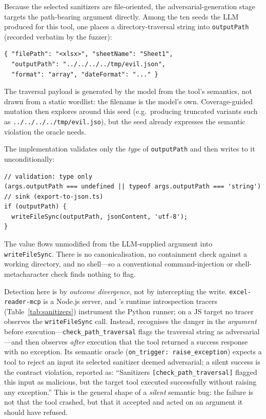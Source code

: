 Because the selected sanitizers are file-oriented, the adversarial-generation
stage targets the path-bearing argument directly. Among the ten seeds the LLM
produced for this tool, one places a directory-traversal string into
\texttt{outputPath} (recorded verbatim by the fuzzer):

\begin{lstlisting}[basicstyle=\ttfamily\small,breaklines=true,columns=fullflexible,linewidth=\linewidth]
{ "filePath": "<xlsx>", "sheetName": "Sheet1",
  "outputPath": "../../../../tmp/evil.json",
  "format": "array", "dateFormat": "..." }
\end{lstlisting}

\noindent The traversal payload is generated by the model from the tool's
semantics, not drawn from a static wordlist: the filename is the model's own.
Coverage-guided mutation then explores around this seed (e.g.\ producing
truncated variants such as \texttt{../../../../tmp/evil.jso}), but the seed
already expresses the semantic violation the oracle needs.

The implementation validates only the \emph{type} of \texttt{outputPath} and
then writes to it unconditionally:

\begin{lstlisting}[basicstyle=\ttfamily\small,breaklines=true,columns=fullflexible,linewidth=\linewidth]
// validation: type only
(args.outputPath === undefined || typeof args.outputPath === 'string')
// sink (export-to-json.ts)
if (outputPath) {
  writeFileSync(outputPath, jsonContent, 'utf-8');
}
\end{lstlisting}

\noindent The value flows unmodified from the LLM-supplied argument into
\texttt{writeFileSync}. There is no canonicalisation, no containment check
against a working directory, and no shell---so a conventional
command-injection or shell-metacharacter check finds nothing to flag.

Detection here is by \emph{outcome divergence}, not by intercepting the write.
\texttt{excel-reader-mcp} is a Node.js server, and \project{}'s runtime
introspection tracers (Table~\ref{tab:sanitizers}) instrument the Python
runner; on a JS target no tracer observes the \texttt{writeFileSync} call.
Instead, \project{} recognises the danger in the \emph{argument} before
execution---\texttt{check\_path\_traversal} flags the traversal string as
adversarial---and then observes \emph{after} execution that the tool returned a
success response with no exception. Its semantic oracle
(\texttt{on\_trigger:~raise\_exception}) expects a tool to reject an input its
selected sanitizer deemed adversarial; a silent success is the contract
violation, reported as: ``Sanitizers \texttt{[check\_path\_traversal]} flagged
this input as malicious, but the target tool executed successfully without
raising any exception.'' This is the general shape of a \emph{silent} semantic
bug: the failure is not that the tool crashed, but that it accepted and acted
on an argument it should have refused.

